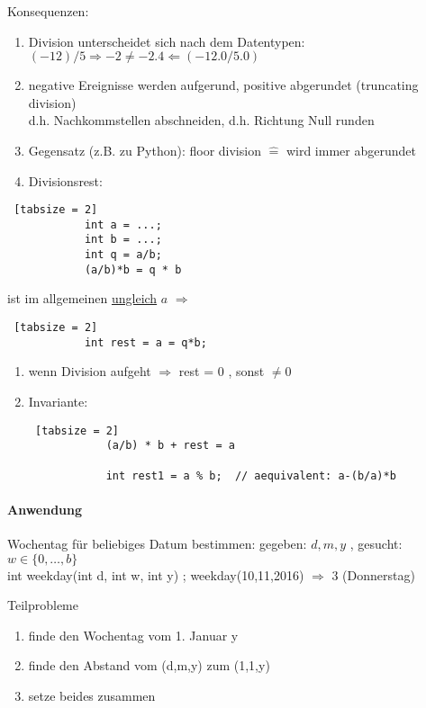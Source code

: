 \documentclass{article}
\begin{document}
	Konsequenzen:
	\begin{enumerate}
		\item Division unterscheidet sich nach dem Datentypen: $(-12)/5 \Rightarrow -2 \neq -2.4 \Leftarrow (-12.0/5.0)$
		\item negative Ereignisse werden aufgerund, positive abgerundet (truncating division) \\
				d.h. Nachkommstellen abschneiden, d.h. Richtung Null runden
		\item Gegensatz (z.B. zu Python): floor division $\widehat{=}$ wird immer abgerundet
		\item Divisionsrest: 
			\end{enumerate}
		\begin{lstlisting} [tabsize = 2]
			int a = ...;
			int b = ...;
			int q = a/b;
			(a/b)*b = q * b
		\end{lstlisting}
		ist im allgemeinen \underline{ungleich} $a$ $\Rightarrow$ 
		\begin{lstlisting} [tabsize = 2]
			int rest = a = q*b;
		\end{lstlisting}
		\begin{enumerate}
		\item wenn Division aufgeht $\Rightarrow$ rest = 0 , sonst $\neq 0$
		\item Invariante: 
		\begin{lstlisting} [tabsize = 2]
			(a/b) * b + rest = a
			
			int rest1 = a % b;  // aequivalent: a-(b/a)*b
		\end{lstlisting}
	\end{enumerate}
	
	\paragraph{Anwendung}
	
	Wochentag für beliebiges Datum bestimmen:
	gegeben: $d,m,y$ , gesucht: $w \in \{0,\dots , b\}$ \\
		int weekday(int d, int w, int y) {}  ; weekday(10,11,2016) $\Rightarrow$ 3 (Donnerstag)
		
		Teilprobleme
		\begin{enumerate}
				\item finde den Wochentag vom 1. Januar y
				\item finde den Abstand vom (d,m,y) zum (1,1,y)
				\item setze beides zusammen \\

		\end{enumerate}
		
\end{document}
